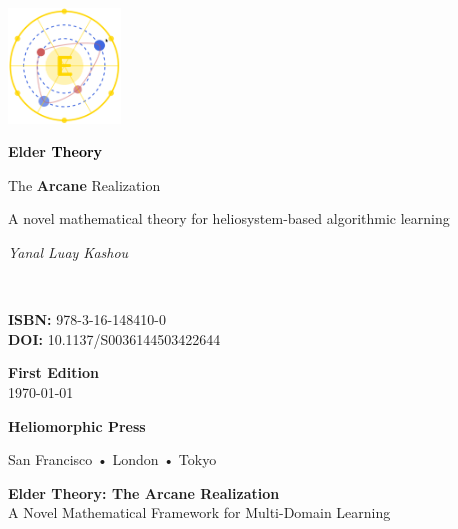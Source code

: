 \documentclass[11pt,twoside]{book}
\begin{document}
\frontmatter

\begin{titlepage}
    \centering
    \vspace*{0.5cm}
    \includegraphics[width=3cm]{figures/elder_symbol.pdf}
    \vspace{0.5cm}
    
    {\Huge\bfseries \textcolor{DarkSkyBlue}{Elder }\textrm{\textcolor{black}{Theory}}\par}
    \vspace{0.8cm}
    {\Large The \textcolor{DarkSkyBlue}{\textbf{Arcane}} Realization\par}
    \vspace{0.3cm}
    {\large A novel mathematical theory for heliosystem-based algorithmic learning\par}
    
    \vspace{3cm}
    {\Large\itshape Yanal Luay Kashou\par}
\    
    \vfill
    
    \begin{minipage}{0.4\textwidth}
        \begin{flushleft}
            \textbf{ISBN:} 978-3-16-148410-0 \\
            \textbf{DOI:} 10.1137/S0036144503422644
        \end{flushleft}
    \end{minipage}%
    \begin{minipage}{0.4\textwidth}
        \begin{flushright}
            \textbf{First Edition} \\
            \today
        \end{flushright}
    \end{minipage}
    
    \vspace{1cm}
    {\large \textbf{Heliomorphic Press}\par}
    {\small San Francisco • London • Tokyo\par}
\end{titlepage}

\thispagestyle{empty}
\vspace*{3cm}
\begin{center}
    {\Large\bfseries Elder Theory: The Arcane Realization}\\[2mm]
    {\large A Novel Mathematical Framework for Multi-Domain Learning}
\end{center}
\end{document}
